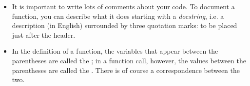 \documentclass[11pt,class=report,crop=false]{standalone}
\begin{document}
\begin{cours}
\begin{itemize}
  \item It is important to write lots of comments about your code. To document a function, you can describe what it does starting with a \emph{docstring}, i.e. a description (in English) surrounded by three quotation marks:   
  to be placed just after the header.

  
  \item In the definition of a function, the variables that appear between the parentheses are called the ; in a function call, however, the values between the parentheses are called the . There is of course a correspondence between the two.


\end{itemize}
\end{cours}


\end{document}
